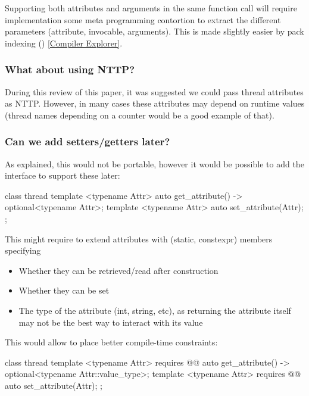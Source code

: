 \documentclass{wg21}
\begin{document}
Supporting both attributes and arguments in the same function call will require implementation some meta programming
contortion to extract the different parameters (attribute, invocable, arguments).
This is made slightly easier by pack indexing () \href{https://compiler-explorer.com/z/n8vYb7Tar}{[Compiler Explorer]}.


\subsubsection{What about using NTTP?}

During this review of this paper, it was suggested we could pass thread attributes as NTTP.
However, in many cases these attributes may depend on runtime values (thread names depending on a counter would be a good example of that).

\subsubsection{Can we add setters/getters later?}

As explained, this would not be portable, however it would be possible to add the interface to support these later:

\begin{colorblock}
class thread {
          template <typename Attr>
          auto get_attribute() -> optional<typename Attr>;
          template <typename Attr>
          auto set_attribute(Attr);
};
\end{colorblock}


This might require to extend attributes with (static, constexpr) members specifying
\begin{itemize}
	\item Whether they can be retrieved/read after construction
	\item Whether they can be set
	\item The type of the attribute (int, string, etc), as returning the attribute itself may not be the best way to interact with its value
\end{itemize}

This would allow to place better compile-time constraints:

\begin{colorblock}
	class thread {
		template <typename Attr>
		requires @@
		auto get_attribute() -> optional<typename Attr::value_type>;
		template <typename Attr>
		requires @@
		auto set_attribute(Attr);
	};
\end{colorblock}
\end{document}
